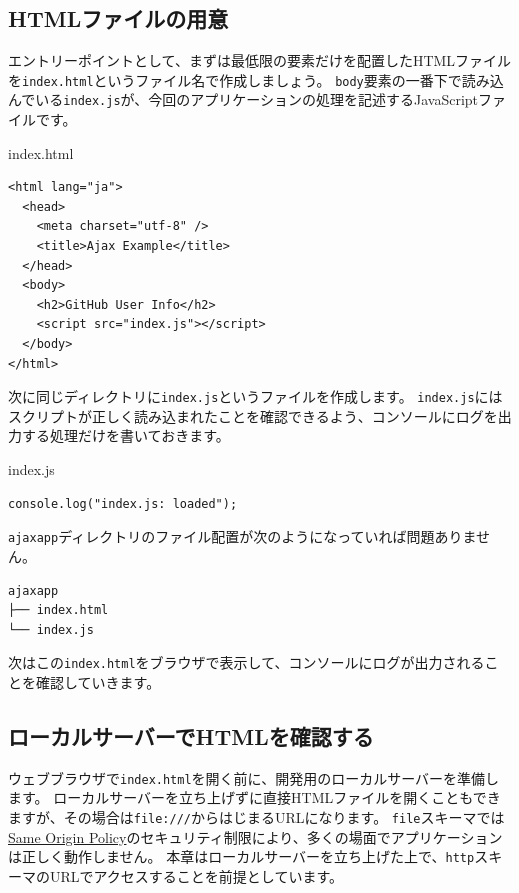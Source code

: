 \hypertarget{preparing-html}{%
\subsection{HTMLファイルの用意}\label{preparing-html}}

エントリーポイントとして、まずは最低限の要素だけを配置したHTMLファイルを\texttt{index.html}というファイル名で作成しましょう。
\texttt{body}要素の一番下で読み込んでいる\texttt{index.js}が、今回のアプリケーションの処理を記述するJavaScriptファイルです。

\begin{listtitle}
index.html
\end{listtitle}
\begin{lstlisting}
<html lang="ja">
  <head>
    <meta charset="utf-8" />
    <title>Ajax Example</title>
  </head>
  <body>
    <h2>GitHub User Info</h2>
    <script src="index.js"></script>
  </body>
</html>
\end{lstlisting}
\listend

次に同じディレクトリに\texttt{index.js}というファイルを作成します。
\texttt{index.js}にはスクリプトが正しく読み込まれたことを確認できるよう、コンソールにログを出力する処理だけを書いておきます。

\begin{listtitle}
index.js
\end{listtitle}
\begin{lstlisting}
console.log("index.js: loaded");
\end{lstlisting}
\listend

\texttt{ajaxapp}ディレクトリのファイル配置が次のようになっていれば問題ありません。

\begin{lstlisting}
ajaxapp
├── index.html
└── index.js
\end{lstlisting}

次はこの\texttt{index.html}をブラウザで表示して、コンソールにログが出力されることを確認していきます。

\hypertarget{local-server}{%
\subsection{ローカルサーバーでHTMLを確認する}\label{local-server}}

ウェブブラウザで\texttt{index.html}を開く前に、開発用のローカルサーバーを準備します。
ローカルサーバーを立ち上げずに直接HTMLファイルを開くこともできますが、その場合は\texttt{file:///}からはじまるURLになります。
\texttt{file}スキーマでは\href{https://developer.mozilla.org/ja/docs/Web/Security/Same-origin_policy}{Same
Origin
Policy}のセキュリティ制限により、多くの場面でアプリケーションは正しく動作しません。
本章はローカルサーバーを立ち上げた上で、\texttt{http}スキーマのURLでアクセスすることを前提としています。


